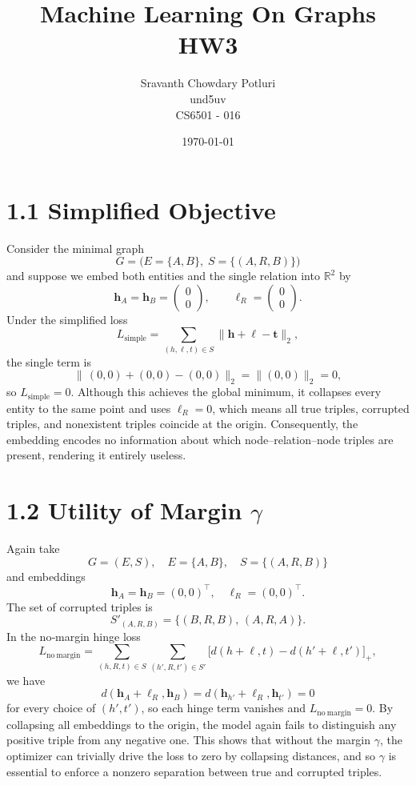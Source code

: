 \documentclass[a4paper,12pt]{article}
\title{Machine Learning On Graphs HW3}
\author{Sravanth Chowdary Potluri \\ und5uv \\ CS6501 - 016}
\date{\today}
\begin{document}
\maketitle

\section*{1.1 Simplified Objective}

Consider the minimal graph
\[
G = \bigl(E = \{A,B\},\; S = \{(A,R,B)\}\bigr)
\]
and suppose we embed both entities and the single relation into \(\mathbb{R}^2\) by
\[
\mathbf{h}_A = \mathbf{h}_B
= \begin{pmatrix}0\\0\end{pmatrix},
\qquad
\boldsymbol{\ell}_R
= \begin{pmatrix}0\\0\end{pmatrix}.
\]
Under the simplified loss
\[
L_{\mathrm{simple}}
= \sum_{(h,\ell,t)\in S} \bigl\|\mathbf{h}+\boldsymbol{\ell}-\mathbf{t}\bigr\|_2,
\]
the single term is
\[
\bigl\|\,(0,0)+(0,0)-(0,0)\bigr\|_2 = \|(0,0)\|_2 = 0,
\]
so \(L_{\mathrm{simple}}=0\).  Although this achieves the global minimum, it collapses every entity to the same point and uses \(\boldsymbol{\ell}_R=0\), which means all true triples, corrupted triples, and nonexistent triples coincide at the origin.  Consequently, the embedding encodes no information about which node–relation–node triples are present, rendering it entirely useless.

\section*{1.2 Utility of Margin \(\gamma\)}

Again take
\[
G = (E,S),\quad E=\{A,B\},\quad S=\{(A,R,B)\}
\]
and embeddings
\[
\mathbf{h}_A=\mathbf{h}_B=(0,0)^\top,
\quad
\boldsymbol{\ell}_R=(0,0)^\top.
\]
The set of corrupted triples is
\[
S'_{(A,R,B)} = \{(B,R,B),\,(A,R,A)\}.
\]
In the no‐margin hinge loss
\[
L_{\mathrm{no\ margin}}
= \sum_{(h,R,t)\in S}\sum_{(h',R,t')\in S'}
\bigl[d(h+\ell,t)-d(h'+\ell,t')\bigr]_+,
\]
we have
\[
d(\mathbf{h}_A+\boldsymbol{\ell}_R,\mathbf{h}_B)
=d(\mathbf{h}_{h'}+\boldsymbol{\ell}_R,\mathbf{h}_{t'})=0
\]
for every choice of \((h',t')\), so each hinge term vanishes and \(L_{\mathrm{no\ margin}}=0\).  By collapsing all embeddings to the origin, the model again fails to distinguish any positive triple from any negative one.  This shows that without the margin \(\gamma\), the optimizer can trivially drive the loss to zero by collapsing distances, and so \(\gamma\) is essential to enforce a nonzero separation between true and corrupted triples.  
\end{document}
